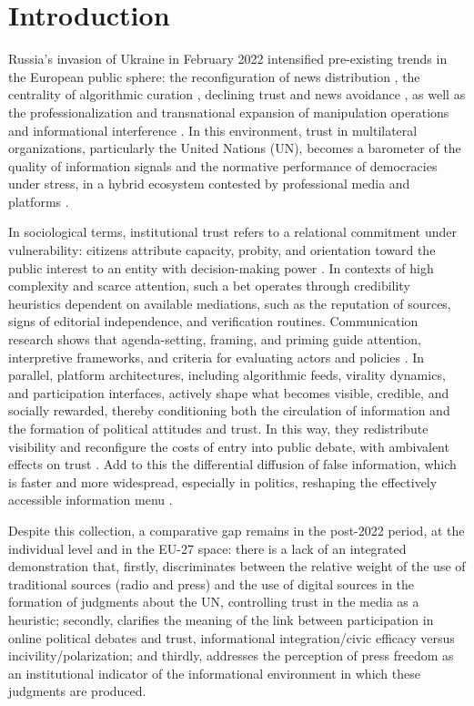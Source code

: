 \documentclass[english]{textolivre}
\begin{document}
\section{Introduction}\label{sec-intro}
Russia’s invasion of Ukraine in February 2022 intensified pre-existing trends in the European public sphere: the reconfiguration of news distribution \cite{benson2025}, the centrality of algorithmic curation \cite{gandini2025}, declining trust \cite{sousa2022, carvalho2025} and news avoidance \cite{bleyersimon2025}, as well as the professionalization and transnational expansion of manipulation operations \cite{woolley2018, sousa2025} and informational interference \cite{chan2024}. In this environment, trust in multilateral organizations, particularly the United Nations (UN), becomes a barometer of the quality of information signals and the normative performance of democracies under stress, in a hybrid ecosystem contested by professional media and platforms \cite{chadwick2017}.

In sociological terms, institutional trust refers to a relational commitment under vulnerability: citizens attribute capacity, probity, and orientation toward the public interest to an entity with decision-making power \cite{mayer1995, levi2000}. In contexts of high complexity and scarce attention, such a bet operates through credibility heuristics dependent on available mediations, such as the reputation of sources, signs of editorial independence, and verification routines. Communication research shows that agenda-setting, framing, and priming guide attention, interpretive frameworks, and criteria for evaluating actors and policies \cite{mccombs1972, entman1993}. In parallel, platform architectures, including algorithmic feeds, virality dynamics, and participation interfaces, actively shape what becomes visible, credible, and socially rewarded, thereby conditioning both the circulation of information and the formation of political attitudes and trust. In this way, they redistribute visibility and reconfigure the costs of entry into public debate, with ambivalent effects on trust \cite{gillespie2018}. Add to this the differential diffusion of false information, which is faster and more widespread, especially in politics, reshaping the effectively accessible information menu \cite{vosoughi2018}.

Despite this collection, a comparative gap remains in the post-2022 period, at the individual level and in the EU-27 space: there is a lack of an integrated demonstration that, firstly, discriminates between the relative weight of the use of traditional sources (radio and press) and the use of digital sources in the formation of judgments about the UN, controlling trust in the media as a heuristic; secondly, clarifies the meaning of the link between participation in online political debates and trust, informational integration/civic efficacy versus incivility/polarization; and thirdly, addresses the perception of press freedom as an institutional indicator of the informational environment in which these judgments are produced.
\end{document}
